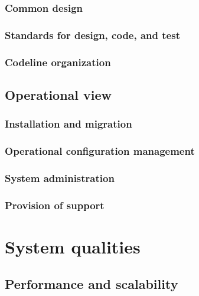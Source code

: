 \documentclass[a4paper,11pt]{report}
\begin{document}
\subsection{Common design}
\label{sec:common-design}


\subsection{Standards for design, code, and test}
\label{sec:stand-design-code}


\subsection{Codeline organization}
\label{sec:codel-organ}


\section{Operational view}
\label{sec:operational-view}

\subsection{Installation and migration}
\label{sec:inst-migr}


\subsection{Operational configuration management}
\label{sec:oper-conf-manag}


\subsection{System administration}
\label{sec:syst-admin}


\subsection{Provision of support}
\label{sec:provision-support}


\chapter{System qualities}
\label{cha:system-qualities}
\thispagestyle{fancy}


\section{Performance and scalability}
\label{sec:perf-scal}
\end{document}
